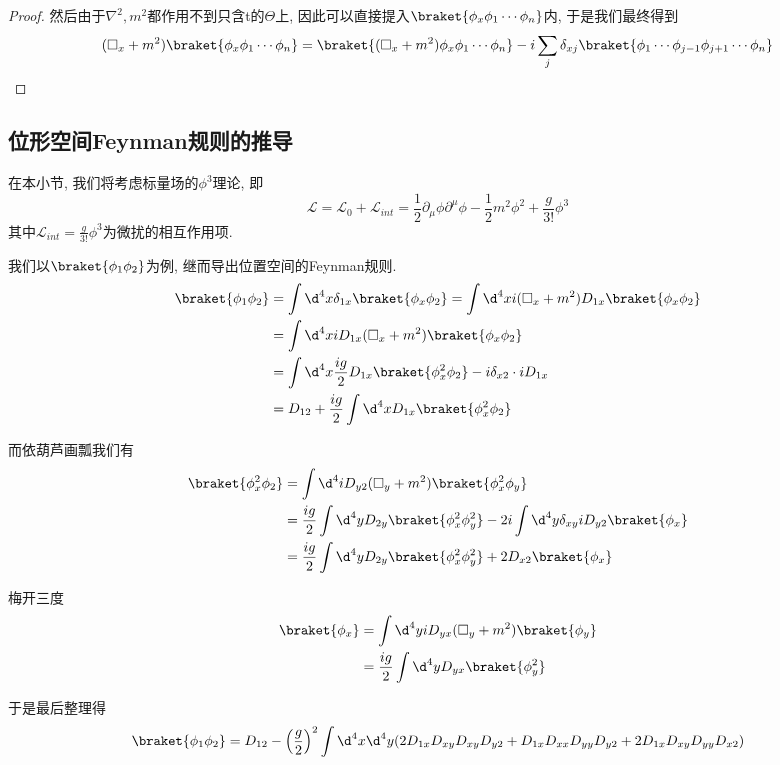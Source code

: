 \begin{proof}
    然后由于$\nabla^2, m^2$都作用不到只含t的$\Theta$上, 因此可以直接提入$\braket{\phi_x\phi_1\cdots\phi_n}$内, 于是我们最终得到
    \begin{equation}
        (\Box_x+m^2)\braket{\phi_x\phi_1\cdots\phi_n}=\braket{(\Box_x+m^2)\phi_x\phi_1\cdots\phi_n}-i\sum_j\delta_{xj}\braket{\phi_1\cdots\phi_{j-1}\phi_{j+1}\cdots\phi_n}
    \end{equation}
\end{proof}

\subsection{位形空间Feynman规则的推导}
在本小节, 我们将考虑标量场的$\phi^3$理论, 即
\begin{equation}
    \mathcal L=\mathcal L_0+\mathcal L_{int}=\frac12\partial_\mu\phi\partial^\mu\phi-\frac12m^2\phi^2+\frac g{3!}\phi^3
\end{equation}
其中$\mathcal L_{int}=\frac g{3!}\phi^3$为微扰的相互作用项.

我们以$\braket{\phi_1\phi_2}$为例, 继而导出位置空间的Feynman规则.
\begin{align}
    \braket{\phi_1\phi_2}&=\int\d^4x\delta_{1x}\braket{\phi_x\phi_2}=\int\d^4xi(\Box_x+m^2)D_{1x}\braket{\phi_x\phi_2}\\
    &=\int\d^4xiD_{1x}(\Box_x+m^2)\braket{\phi_x\phi_2}\\
    &=\int\d^4x\frac{ig}2 D_{1x}\braket{\phi_x^2\phi_2}-i\delta_{x2}\cdot iD_{1x}\\
    &=D_{12}+\frac{ig}2\int\d^4xD_{1x}\braket{\phi_x^2\phi_2}
\end{align}

而依葫芦画瓢我们有
\begin{align}
    \braket{\phi_x^2\phi_2}&=\int\d^4 iD_{y2}(\Box_y+m^2)\braket{\phi_x^2\phi_y}\\
    &=\frac{ig}2\int\d^4y D_{2y}\braket{\phi_x^2\phi_y^2}-2i\int\d^4y \delta_{xy}iD_{y2}\braket{\phi_x}\\
    &=\frac{ig}2\int\d^4y D_{2y}\braket{\phi_x^2\phi_y^2}+2D_{x2}\braket{\phi_x}
\end{align}

梅开三度
\begin{align}
    \braket{\phi_x}&=\int\d^4y iD_{yx}(\Box_y+m^2)\braket{\phi_y}\\
    &=\frac{ig}2\int\d^4y D_{yx}\braket{\phi_y^2}
\end{align}

于是最后整理得
\begin{equation}
    \braket{\phi_1\phi_2}=D_{12}-\left(\frac g2\right)^2\int \d^4x\d^4y(2D_{1x}D_{xy}D_{xy}D_{y2}+D_{1x}D_{xx}D_{yy}D_{y2}+2D_{1x}D_{xy}D_{yy}D_{x2})\label{2pt-correlation-expansion-schwinger-dyson}
\end{equation}

